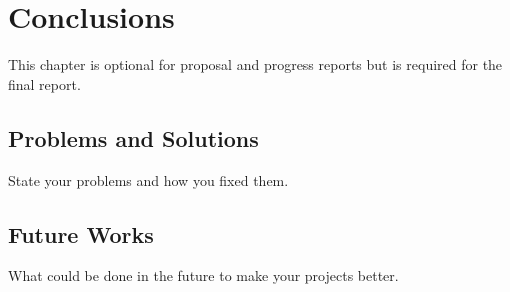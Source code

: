 \documentclass[12pt,oneside,openright,a4paper]{cpe-english-project}
\begin{document}
\chapter{Conclusions}

This chapter is optional for proposal and progress reports but 
is required for the final report.

\section{Problems and Solutions}
State your problems and how you fixed them.

\section{Future Works}
What could be done in the future to make your projects better.


\nocite{*}







\end{document}
